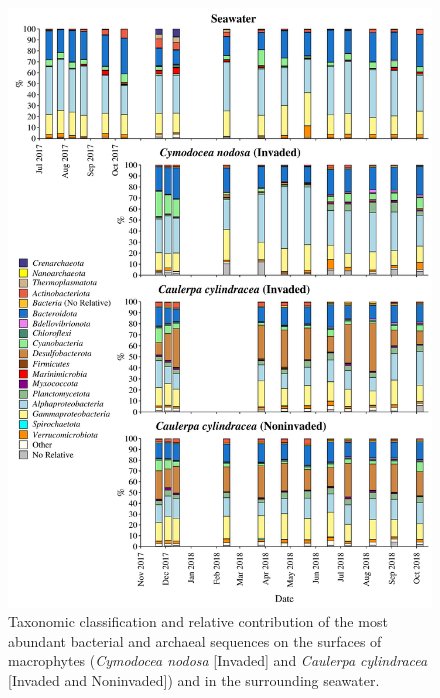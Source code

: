 \documentclass[12pt,]{article}
\begin{document}
\begin{figure}[H]

{\centering \includegraphics[width=0.85\linewidth]{../results/figures/community_bar_plot} 

}

\caption{Taxonomic classification and relative contribution of the most abundant bacterial and archaeal sequences on the surfaces of macrophytes (\textit{Cymodocea nodosa} [Invaded] and \textit{Caulerpa cylindracea} [Invaded and Noninvaded]) and in the surrounding seawater.\label{community}}\label{fig:unnamed-chunk-6}
\end{figure}
\end{document}
